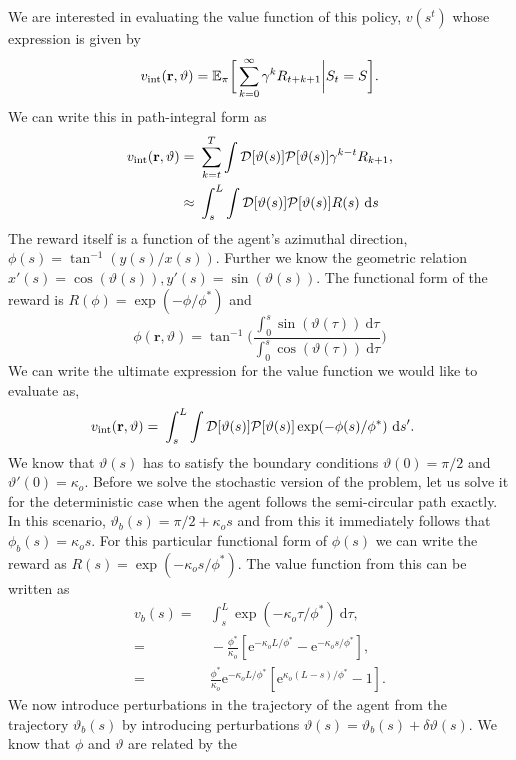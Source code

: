 \documentclass[12pt]{article}
\def\d{\text{d}}
\def\e{\text{e}}
\def\r{\mathbf{r}}
\def\E{\mathbb{E}}
\def\P{\mathcal{P}}
\def\D{\mathcal{D}}
\def\theta{\vartheta}
\begin{document}
We are interested in evaluating the value function of this policy, $v(s^t)$ whose
expression is given by
\[
    v_{\rm int}(\r, \theta) = \E_\pi \bigg[ \sum_{k=0}^\infty \gamma^k R_{t+k+1} \bigg| S_t = S \bigg].
\]
We can write this in path-integral form as
\begin{align}
    v_{\rm int}(\r, \theta) =& \ \sum_{k=t}^T \int \D[\theta(s)] \P[\theta(s)] \gamma^{k-t} R_{k+1}, \\
    \approx& \ \int_{s}^L \int \D[\theta(s)] \P[\theta(s)] R(s) \ \d s
\end{align}
The reward itself is a function of the agent's azimuthal direction, $\phi(s) = \tan^{-1}(y(s)/x(s))$.
Further we know the geometric relation $x'(s) = \cos(\theta(s)), y'(s) = \sin(\theta(s))$. The functional
form of the reward is $R(\phi) = \exp(-\phi/\phi^*)$ and 
\[
    \phi(\r, \theta) = \tan^{-1}\bigg( \frac{\int_0^s \sin(\theta(\tau)) \ \d \tau}{\int_0^s \cos(\theta(\tau)) \ \d \tau} \bigg)
\]
We can write the ultimate expression for the value function we would like to evaluate as,
\begin{align}
    v_{\rm int}(\r, \theta) =& \ \int_{s}^L \int \D[\theta(s)] \P[\theta(s)] \exp(-\phi(s)/\phi^*) \ \d s'.
\end{align}
We know that $\theta(s)$ has to satisfy the boundary conditions $\theta(0) = \pi/2$ and $\theta'(0) = \kappa_o$.
Before we solve the stochastic version of the problem, let us solve it for the deterministic case when
the agent follows the semi-circular path exactly. In this scenario, $\theta_b(s) = \pi/2 + \kappa_o s$ and
from this it immediately follows that $\phi_b(s) = \kappa_o s$. For this particular functional form of $\phi(s)$
we can write the reward as $R(s) = \exp(-\kappa_o s/\phi^*)$. The value function from this can be written as
\begin{align}
    v_b(s) =& \ \int_s^L \exp(-\kappa_o \tau/\phi^*) \ \d \tau, \\
    =& \ -\frac{\phi^*}{\kappa_o} [\e^{-\kappa_o L/\phi^*} - \e^{-\kappa_o s/\phi^*}], \\
    =& \ \frac{\phi^*}{\kappa_o} \e^{-\kappa_o L/\phi^*} [ \e^{\kappa_o(L-s)/\phi^*} - 1].
\end{align}
We now introduce perturbations in the trajectory of the agent from the trajectory $\theta_b(s)$ by introducing
perturbations $\theta(s) = \theta_b(s) + \delta \theta(s)$. We know that $\phi$ and $\theta$ are related by the
\end{document}

